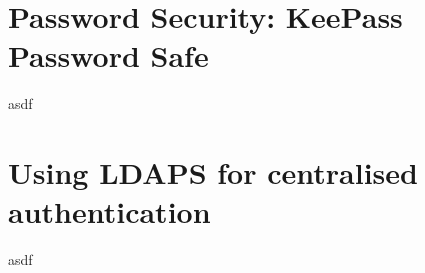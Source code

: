 \documentclass[11pt,a4paper]{scrartcl}
\begin{document}
	
\section*{Password Security: KeePass Password Safe}

asdf

\section*{Using LDAPS for centralised authentication}
	
asdf
\end{document}
